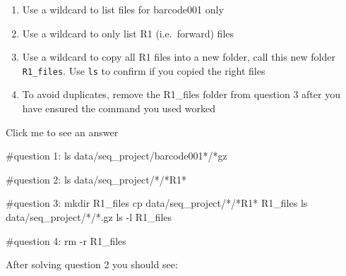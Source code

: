 \documentclass[
  letterpaper,
  DIV=11,
  numbers=noendperiod]{scrreprt}
\newenvironment{Shaded}{}{}
\newcommand{\AttributeTok}[1]{\textcolor[rgb]{0.84,0.23,0.29}{#1}}
\newcommand{\CommentTok}[1]{\textcolor[rgb]{0.42,0.45,0.49}{#1}}
\newcommand{\FunctionTok}[1]{\textcolor[rgb]{0.44,0.26,0.76}{#1}}
\newcommand{\NormalTok}[1]{\textcolor[rgb]{0.14,0.16,0.18}{#1}}
\newcommand{\PreprocessorTok}[1]{\textcolor[rgb]{0.84,0.23,0.29}{#1}}
\providecommand{\tightlist}{%
  \setlength{\itemsep}{0pt}\setlength{\parskip}{0pt}}\usepackage{longtable,booktabs,array}
\begin{document}
\begin{tcolorbox}[enhanced jigsaw, breakable, left=2mm, title=\textcolor{quarto-callout-caution-color}{\faFire}\hspace{0.5em}{Exercise}, opacityback=0, opacitybacktitle=0.6, rightrule=.15mm, bottomrule=.15mm, colback=white, colframe=quarto-callout-caution-color-frame, coltitle=black, bottomtitle=1mm, arc=.35mm, toprule=.15mm, colbacktitle=quarto-callout-caution-color!10!white, toptitle=1mm, titlerule=0mm, leftrule=.75mm]

\begin{enumerate}
\def\labelenumi{\arabic{enumi}.}
\tightlist
\item
  Use a wildcard to list files for barcode001 only
\item
  Use a wildcard to only list R1 (i.e.~forward) files
\item
  Use a wildcard to copy all R1 files into a new folder, call this new
  folder \texttt{R1\_files}. Use \texttt{ls} to confirm if you copied
  the right files
\item
  To avoid duplicates, remove the R1\_files folder from question 3 after
  you have ensured the command you used worked
\end{enumerate}

Click me to see an answer

\begin{Shaded}
\begin{Highlighting}[]
\CommentTok{\#question 1:}
\FunctionTok{ls}\NormalTok{ data/seq\_project/barcode001}\PreprocessorTok{*}\NormalTok{/}\PreprocessorTok{*}\NormalTok{gz}

\CommentTok{\#question 2:}
\FunctionTok{ls}\NormalTok{ data/seq\_project/}\PreprocessorTok{*}\NormalTok{/}\PreprocessorTok{*}\NormalTok{R1}\PreprocessorTok{*}

\CommentTok{\#question 3:}
\FunctionTok{mkdir}\NormalTok{ R1\_files}
\FunctionTok{cp}\NormalTok{ data/seq\_project/}\PreprocessorTok{*}\NormalTok{/}\PreprocessorTok{*}\NormalTok{R1}\PreprocessorTok{*}\NormalTok{ R1\_files}
\FunctionTok{ls}\NormalTok{ data/seq\_project/}\PreprocessorTok{*}\NormalTok{/}\PreprocessorTok{*}\NormalTok{.gz}
\FunctionTok{ls} \AttributeTok{{-}l}\NormalTok{ R1\_files}

\CommentTok{\#question 4:}
\FunctionTok{rm} \AttributeTok{{-}r}\NormalTok{ R1\_files}
\end{Highlighting}
\end{Shaded}

After solving question 2 you should see:


\end{tcolorbox}
\end{document}

